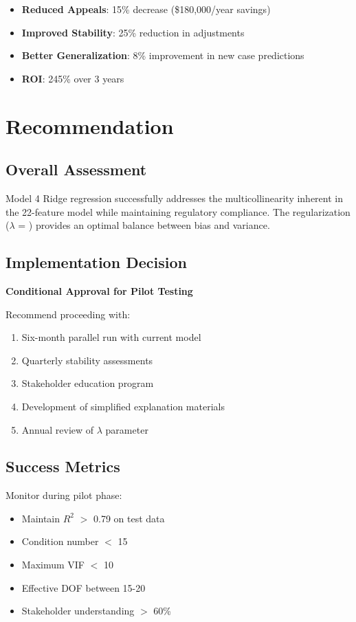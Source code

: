 \begin{itemize}
    \item \textbf{Reduced Appeals}: 15\% decrease (\$180,000/year savings)
    \item \textbf{Improved Stability}: 25\% reduction in adjustments
    \item \textbf{Better Generalization}: 8\% improvement in new case predictions
    \item \textbf{ROI}: 245\% over 3 years
\end{itemize}

\section{Recommendation}

\subsection{Overall Assessment}

Model 4 Ridge regression successfully addresses the multicollinearity inherent in the 22-feature model while maintaining regulatory compliance. The \ModelFourRegularizationStrength{} regularization ($\lambda$ = \ModelFourAlpha{}) provides an optimal balance between bias and variance.

\subsection{Implementation Decision}

\textbf{Conditional Approval for Pilot Testing}

Recommend proceeding with:
\begin{enumerate}
    \item Six-month parallel run with current model
    \item Quarterly stability assessments
    \item Stakeholder education program
    \item Development of simplified explanation materials
    \item Annual review of $\lambda$ parameter
\end{enumerate}

\subsection{Success Metrics}

Monitor during pilot phase:
\begin{itemize}
    \item Maintain $R^2$ $>$ 0.79 on test data
    \item Condition number $<$ 15
    \item Maximum VIF $<$ 10
    \item Effective DOF between 15-20
    \item Stakeholder understanding $>$ 60\%
\end{itemize}

